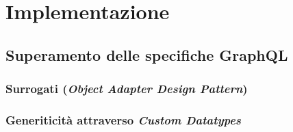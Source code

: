 \chapter{Implementazione}\label{chap:implementation}
\section{Superamento delle specifiche GraphQL}\label{sec:overcoming-gql-specs}
\subsection{Surrogati (\textit{Object Adapter Design Pattern})}\label{ssec:surrogates}
\subsection{Generiticità attraverso \textit{Custom Datatypes}}\label{ssec:custom-dtypes}

